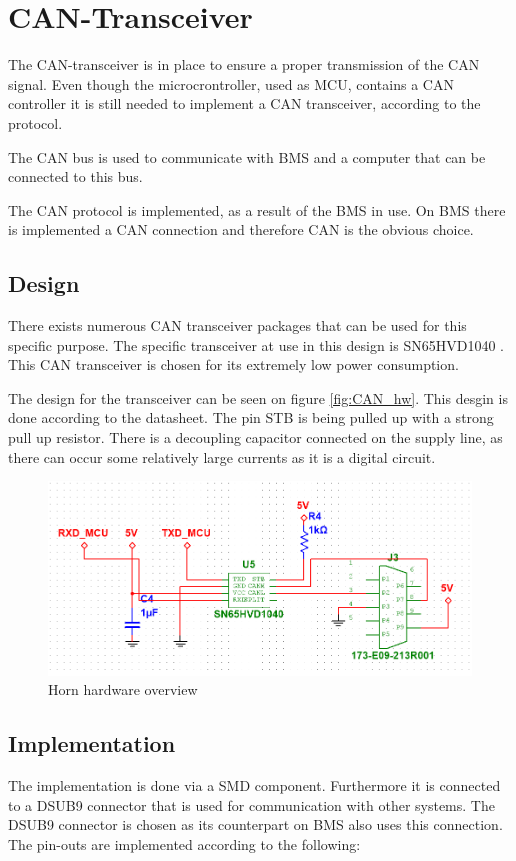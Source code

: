 \section{CAN-Transceiver}
\label{sec:CAN-Tranceiver}
The CAN-transceiver is in place to ensure a proper transmission of the CAN signal. Even though the microcrontroller, used as MCU, contains a CAN controller it is still needed to implement a CAN transceiver, according to the protocol.

The CAN bus is used to communicate with BMS and a computer that can be connected to this bus. 

The CAN protocol is implemented, as a result of the BMS in use. On BMS there is implemented a CAN connection and therefore CAN is the obvious choice.    

\subsection{Design}
There exists numerous CAN transceiver packages that can be used for this specific purpose. The specific transceiver at use in this design is SN65HVD1040 . This CAN transceiver is chosen for its extremely low power consumption. 

The design for the transceiver can be seen on figure \vref{fig:CAN_hw}. This desgin is done according to the datasheet. The pin STB is being pulled up with a strong pull up resistor. There is a decoupling capacitor connected on the supply line, as there can occur some relatively large currents as it is a digital circuit. 

\begin{figure}[H]
	\centering
	\includegraphics[width=0.7\linewidth]{Hardware/Pictures/CAN_transceiver}
	\caption{Horn hardware overview}
	\label{fig:CAN_hw}
\end{figure}

\subsection{Implementation}
The implementation is done via a SMD component. Furthermore it is connected to a DSUB9 connector that is used for communication with other systems. The DSUB9 connector is chosen as its counterpart on BMS also uses this connection. The pin-outs are implemented according to the following:

